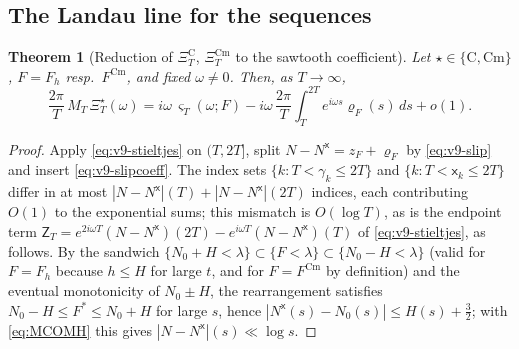 \documentclass[11pt,a4paper]{article}
\numberwithin{equation}{section}
\newtheorem{theorem}{Theorem}[section]
\theoremstyle{definition}
\theoremstyle{remark}
\newcommand{\Cm}{\mathrm{Cm}}
\begin{document}
\subsection{The Landau line for the sequences}\label{sec:v9-lines}
\begin{theorem}[Reduction of $\Xi_T^{\mathrm C}$, $\Xi_T^{\Cm}$ to the sawtooth coefficient]\label{thm:v9-reduction}
Let $\star\in\{\mathrm C,\Cm\}$, $F=F_h$ resp.\ $F^{\Cm}$, and fixed $\omega\ne0$. Then, as $T\to\infty$,
\begin{equation}\label{eq:v9-reduction}
\frac{2\pi}T\,M_T\,\Xi_T^\star(\omega)=i\omega\,\varsigma_T(\omega;F)-i\omega\,\frac{2\pi}{T}\int_T^{2T}e^{i\omega s}\varrho_F(s)\,ds+o(1).
\end{equation}
\end{theorem}
\begin{proof}
Apply \eqref{eq:v9-stieltjes} on $(T,2T]$, split $N-N^{\mathsf x}=z_F+\varrho_F$ by \eqref{eq:v9-slip} and insert \eqref{eq:v9-slipcoeff}. The index sets $\{k:T<\gamma_k\le2T\}$ and $\{k:T<\mathsf x_k\le2T\}$ differ in at most $|N-N^{\mathsf x}|(T)+|N-N^{\mathsf x}|(2T)$ indices, each contributing $O(1)$ to the exponential sums; this mismatch is $O(\log T)$, as is the endpoint term $\mathsf Z_T=e^{2i\omega T}(N-N^{\mathsf x})(2T)-e^{i\omega T}(N-N^{\mathsf x})(T)$ of \eqref{eq:v9-stieltjes}, as follows. By the sandwich $\{N_0+H<\lambda\}\subset\{F<\lambda\}\subset\{N_0-H<\lambda\}$ (valid for $F=F_h$ because $h\le H$ for large $t$, and for $F=F^{\Cm}$ by definition) and the eventual monotonicity of $N_0\pm H$, the rearrangement satisfies $N_0-H\le F^*\le N_0+H$ for large $s$, hence $|N^{\mathsf x}(s)-N_0(s)|\le H(s)+\frac32$; with \eqref{eq:MCOMH} this gives $|N-N^{\mathsf x}|(s)\ll\log s$.
\end{proof}
\end{document}
